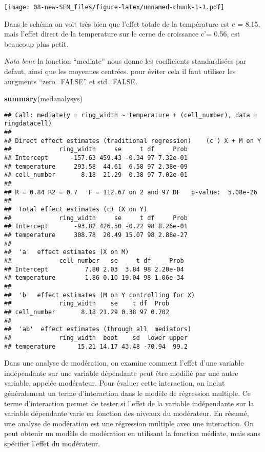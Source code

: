 \documentclass[
]{article}
\newenvironment{Shaded}{\begin{snugshade}}{\end{snugshade}}
\newcommand{\FunctionTok}[1]{\textcolor[rgb]{0.13,0.29,0.53}{\textbf{#1}}}
\newcommand{\NormalTok}[1]{#1}
\begin{document}
\texttt{[image: 08-new-SEM\_files/figure-latex/unnamed-chunk-1-1.pdf]}

Dans le schéma on voit très bien que l'effet totale de la température
est c = 8.15, mais l'effet direct de la temperature sur le cerne de
croissance c'= 0.56, est beaucoup plus petit.

\emph{Nota bene} la fonction ``mediate'' nous donne les coefficients
standardisées par defaut, ainsi que les moyennes centrées. pour éviter
cela il faut utiliser les aurgments ``zero=FALSE'' et std=FALSE.

\begin{Shaded}
\begin{Highlighting}[]
\FunctionTok{summary}\NormalTok{(medanalysys)}
\end{Highlighting}
\end{Shaded}

\begin{verbatim}
## Call: mediate(y = ring_width ~ temperature + (cell_number), data = ringdatacell)
## 
## Direct effect estimates (traditional regression)    (c') X + M on Y 
##             ring_width     se     t df     Prob
## Intercept      -157.63 459.43 -0.34 97 7.32e-01
## temperature     293.58  44.61  6.58 97 2.38e-09
## cell_number       8.18  21.29  0.38 97 7.02e-01
## 
## R = 0.84 R2 = 0.7   F = 112.67 on 2 and 97 DF   p-value:  5.08e-26 
## 
##  Total effect estimates (c) (X on Y) 
##             ring_width     se     t df     Prob
## Intercept       -93.82 426.50 -0.22 98 8.26e-01
## temperature     308.78  20.49 15.07 98 2.88e-27
## 
##  'a'  effect estimates (X on M) 
##             cell_number   se     t df     Prob
## Intercept          7.80 2.03  3.84 98 2.20e-04
## temperature        1.86 0.10 19.04 98 1.06e-34
## 
##  'b'  effect estimates (M on Y controlling for X) 
##             ring_width    se    t df  Prob
## cell_number       8.18 21.29 0.38 97 0.702
## 
##  'ab'  effect estimates (through all  mediators)
##             ring_width  boot    sd  lower upper
## temperature      15.21 14.17 43.48 -70.94  99.2
\end{verbatim}

Dans une analyse de modération, on examine comment l'effet d'une
variable indépendante sur une variable dépendante peut être modifié par
une autre variable, appelée modérateur. Pour évaluer cette interaction,
on inclut généralement un terme d'interaction dans le modèle de
régression multiple. Ce terme d'interaction permet de tester si l'effet
de la variable indépendante sur la variable dépendante varie en fonction
des niveaux du modérateur. En résumé, une analyse de modération est une
régression multiple avec une interaction. On peut obtenir un modèle de
modération en utilisant la fonction médiate, mais sans spécifier l'effet
du modérateur.
\end{document}
